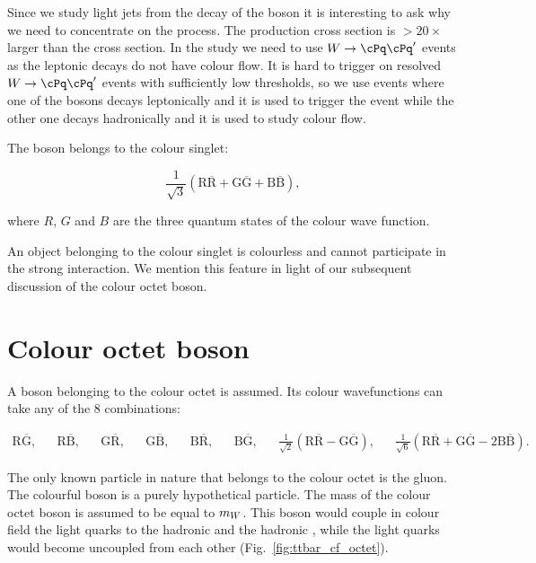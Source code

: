 Since we study light jets from the decay of the \PW boson it is interesting to ask why we need to concentrate on the \ttbar process. The \PW production cross section is $>20\times$ larger than the \ttbar cross section. In the study we need to use  $\PW\rightarrow\cPq\cPq'$ events as the leptonic decays do not have colour flow. It is hard to trigger on resolved $\PW\rightarrow\cPq\cPq'$ events with sufficiently low \pt thresholds, so we use \ttbar events where one of the \PW bosons decays leptonically and it is used to trigger the event while the other one decays hadronically and it is used to study colour flow.

The \PW boson belongs to the colour singlet:

\begin{equation}
\frac{1}{\sqrt{3}}\left(\text{R}\overline{\text{R}}+\text{G}\overline{\text{G}}+\text{B}\overline{\text{B}}\right),
\end{equation}

where $R$, $G$ and $B$ are the three quantum states of the colour wave function.

An object belonging to the colour singlet is colourless and cannot participate in the strong interaction. We mention this feature in light of our subsequent discussion of the colour octet \PW boson.

\section{Colour octet \PW boson}

A \PW boson belonging to the colour octet is assumed. Its colour wavefunctions can take any of the 8 combinations:

\begin{align}
\text{R}\overline{\text{G}}, &&
\text{R}\overline{\text{B}}, &&
\text{G}\overline{\text{R}}, &&
\text{G}\overline{\text{B}}, &&
\text{B}\overline{\text{R}}, &&
\text{B}\overline{\text{G}}, &&
\frac{1}{\sqrt{2}}\left(\text{R}\overline{\text{R}}-\text{G}\overline{\text{G}}\right), &&
\frac{1}{\sqrt{6}}\left(\text{R}\overline{\text{R}}+\text{G}\overline{\text{G}}-2\text{B}\overline{\text{B}}\right).
\end{align}

The only known particle in nature that belongs to the colour octet is the gluon. The colourful \PW boson is a purely hypothetical particle. The mass of the colour octet \PW boson is assumed to be equal to $m_{W}$. This boson would couple in colour field the light quarks to the hadronic \cPqb and the hadronic \cPqt, while the light quarks would become uncoupled from each other (Fig.~\ref{fig:ttbar_cf_octet}).

